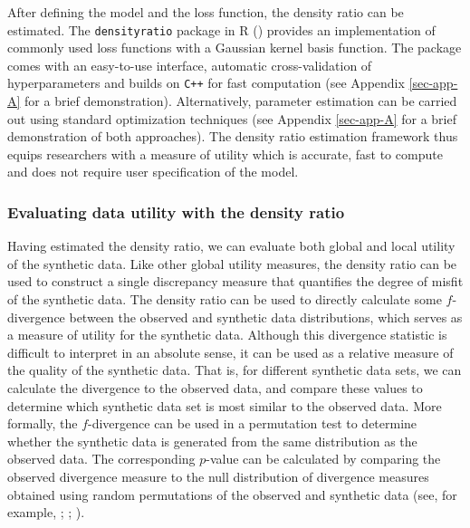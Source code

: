 \documentclass[
]{article}
\begin{document}
After defining the model and the loss function, the density ratio can be
estimated. The \texttt{densityratio} package in R
() provides an implementation of
commonly used loss functions with a Gaussian kernel basis function. The
package comes with an easy-to-use interface, automatic cross-validation
of hyperparameters and builds on \texttt{C++} for fast computation (see
Appendix \ref{sec-app-A} for a brief demonstration). Alternatively,
parameter estimation can be carried out using standard optimization
techniques (see Appendix \ref{sec-app-A} for a brief demonstration of
both approaches). The density ratio estimation framework thus equips
researchers with a measure of utility which is accurate, fast to compute
and does not require user specification of the model.

\subsubsection{Evaluating data utility with the density
ratio}\label{evaluating-data-utility-with-the-density-ratio}

Having estimated the density ratio, we can evaluate both global and
local utility of the synthetic data. Like other global utility measures,
the density ratio can be used to construct a single discrepancy measure
that quantifies the degree of misfit of the synthetic data. The density
ratio can be used to directly calculate some \(f\)-divergence between
the observed and synthetic data distributions, which serves as a measure
of utility for the synthetic data. Although this divergence statistic is
difficult to interpret in an absolute sense, it can be used as a
relative measure of the quality of the synthetic data. That is, for
different synthetic data sets, we can calculate the divergence to the
observed data, and compare these values to determine which synthetic
data set is most similar to the observed data. More formally, the
\(f\)-divergence can be used in a permutation test to determine whether
the synthetic data is generated from the same distribution as the
observed data. The corresponding \(p\)-value can be calculated by
comparing the observed divergence measure to the null distribution of
divergence measures obtained using random permutations of the observed
and synthetic data (see, for example,
;
;
).
\end{document}
